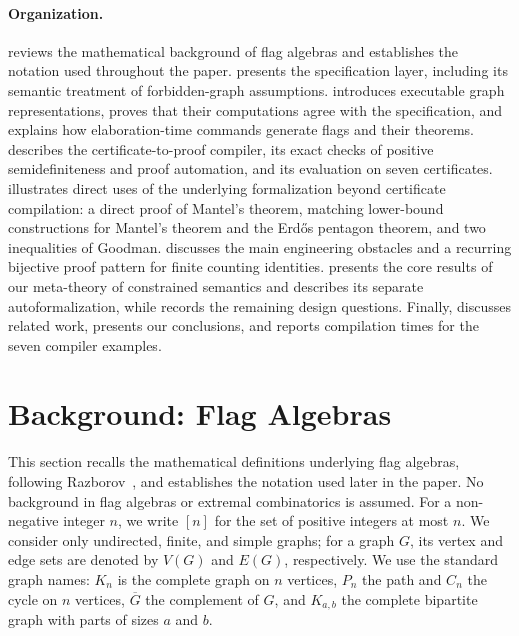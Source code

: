 \documentclass{article}
\begin{document}
\paragraph{Organization.}
 reviews the mathematical background of flag algebras and
establishes the notation used throughout the paper.  
presents the specification layer, including its semantic treatment of
forbidden-graph assumptions.   introduces executable
graph representations, proves that their computations agree with the
specification, and explains how elaboration-time commands generate flags and
their theorems.   describes the
certificate-to-proof compiler, its exact checks of positive semidefiniteness
and proof automation, and its evaluation on seven certificates.
 illustrates direct uses of the underlying formalization
beyond certificate compilation: a direct proof of Mantel's theorem, matching
lower-bound constructions for Mantel's theorem and the Erd\H{o}s pentagon
theorem, and two inequalities of Goodman.   discusses
the main engineering obstacles and a recurring bijective proof pattern for
finite counting identities.   presents the core results
of our meta-theory of constrained semantics and describes its separate
autoformalization, while
 records the remaining design questions.  Finally,
 discusses related work,  presents our
conclusions, and  reports compilation times for the seven
compiler examples.


\section{Background: Flag Algebras}
\label{sec:background}

This section recalls the mathematical definitions underlying flag algebras,
following Razborov~\cite{razborov2007flag}, and establishes the notation used
later in the paper.  No background in flag algebras or extremal combinatorics
is assumed.  For a non-negative integer $n$, we write $[n]$ for the set of
positive integers at most $n$.  We consider only undirected, finite, and simple
graphs; for a graph $G$, its vertex and edge sets are denoted by $V(G)$ and $E(G)$,
respectively.
We use the standard graph names: $K_n$ is the complete graph on $n$ vertices,
$P_n$ the path and $C_n$ the cycle on $n$ vertices, $\overline{G}$ the
complement of $G$, and $K_{a,b}$ the complete bipartite graph with parts of
sizes $a$ and $b$.
\end{document}
